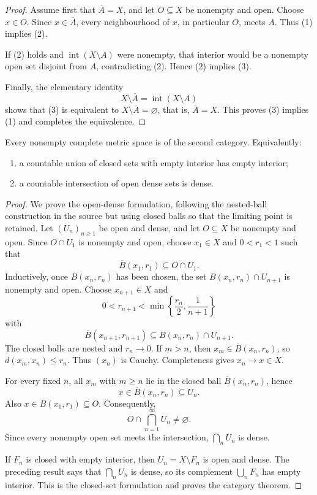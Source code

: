 \begin{proof}
Assume first that $\overline A=X$, and let $O\subseteq X$ be nonempty and
open.  Choose $x\in O$.  Since $x\in\overline A$, every neighbourhood of
$x$, in particular $O$, meets $A$.  Thus (1) implies (2).

If (2) holds and $\operatorname{int}(X\setminus A)$ were nonempty, that
interior would be a nonempty open set disjoint from $A$, contradicting (2).
Hence (2) implies (3).

Finally, the elementary identity
\[
  X\setminus\overline A=\operatorname{int}(X\setminus A)
\]
shows that (3) is equivalent to $X\setminus\overline A=\varnothing$, that is,
$\overline A=X$.  This proves (3) implies (1) and completes the equivalence.
\end{proof}

\begin{notetheorem}
Every nonempty complete metric space is of the second category.  Equivalently:
\begin{enumerate}
  \item a countable union of closed sets with empty interior has empty
        interior;
  \item a countable intersection of open dense sets is dense.
\end{enumerate}
\end{notetheorem}

\begin{proof}
We prove the open-dense formulation, following the nested-ball construction
in the source but using closed balls so that the limiting point is retained.
Let $(U_n)_{n\ge1}$ be open and dense, and let $O\subseteq X$ be nonempty
and open.  Since $O\cap U_1$ is nonempty and open, choose $x_1\in X$ and
$0<r_1<1$ such that
\[
  \overline B(x_1,r_1)\subseteq O\cap U_1.
\]
Inductively, once $\overline B(x_n,r_n)$ has been chosen, the set
$B(x_n,r_n)\cap U_{n+1}$ is nonempty and open.  Choose
$x_{n+1}\in X$ and
\[
  0<r_{n+1}<\min\left\{\frac{r_n}{2},\frac1{n+1}\right\}
\]
with
\[
  \overline B(x_{n+1},r_{n+1})
  \subseteq B(x_n,r_n)\cap U_{n+1}.
\]
The closed balls are nested and $r_n\to0$.  If $m>n$, then
$x_m\in\overline B(x_n,r_n)$, so $d(x_m,x_n)\le r_n$.  Thus $(x_n)$ is
Cauchy.  Completeness gives $x_n\to x\in X$.

For every fixed $n$, all $x_m$ with $m\ge n$ lie in the closed ball
$\overline B(x_n,r_n)$, hence
\[
  x\in\overline B(x_n,r_n)\subseteq U_n.
\]
Also $x\in\overline B(x_1,r_1)\subseteq O$.  Consequently,
\[
  O\cap\bigcap_{n=1}^{\infty}U_n\ne\varnothing.
\]
Since every nonempty open set meets the intersection, $\bigcap_nU_n$ is
dense.

If $F_n$ is closed with empty interior, then $U_n=X\setminus F_n$ is open
and dense.  The preceding result says that $\bigcap_nU_n$ is dense, so its
complement $\bigcup_nF_n$ has empty interior.  This is the closed-set
formulation and proves the category theorem.
\end{proof}

